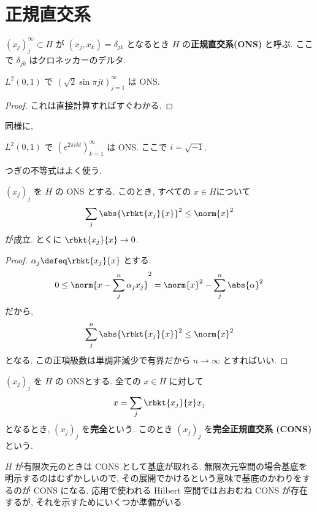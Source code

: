 \documentclass[openany, a4paper, oneside]{jsbook}
\begin{document}
\section{正規直交系}

\begin{defn}
$(x_j)_j^{\infty} \subset H$ が $(x_j, x_k) = \delta_{jk}$ となるとき
$H$ の\textbf{正規直交系(ONS)} と呼ぶ.
ここで $\delta_{jk}$ はクロネッカーのデルタ.
\end{defn}
\begin{ex}
$L^2(0, 1)$ で $(\sqrt{2}\sin \pi jt)_{j=1}^{\infty}$ は ONS.
\end{ex}
\begin{proof}
これは直接計算すればすぐわかる.
\end{proof}
同様に,
\begin{ex}
$L^2(0, 1)$ で $(e^{2 \pi i k t})_{k=1}^{\infty}$ は ONS.
ここで $i = \sqrt{-1}$.
\end{ex}

つぎの不等式はよく使う.
\begin{thm}
 $(x_j)_j$ を $H$ の ONS とする.
 このとき, すべての $x \in H $について
 \begin{align}
  \sum_j \abs{\rbkt{x_j}{x}}^2
  \le
  \norm{x}^2
 \end{align}
 が成立.
 とくに $\rbkt{x_j}{x} \to 0$.
\end{thm}
\begin{proof}
$\alpha_j \defeq \rbkt{x_j}{x}$ とする.
\begin{align}
 0
 \le
 \norm{x - \sum_j^n \alpha_j x_j}^2
 =
 \norm{x}^2 - \sum_j^n \abs{\alpha}^2
\end{align}
だから,
\begin{align}
 \sum_j^n \abs{\rbkt{x_j}{x}}^2
 \leq
 \norm{x}^2
\end{align}
となる.
この正項級数は単調非減少で有界だから $n \to \infty$ とすればいい.
\end{proof}

\begin{defn}[完全正規直交系]
$(x_j)_j$ を $H$ の ONSとする.
全ての $x \in H$ に対して
\begin{align}
 x
 =
 \sum_j \rbkt{x_j}{x} x_j
\end{align}
となるとき, $(x_j)_j$ を\textbf{完全}という.
このとき $(x_j)_j$ を\textbf{完全正規直交系 (CONS)} という.
\end{defn}
$H$ が有限次元のときは CONS として基底が取れる.
無限次元空間の場合基底を明示するのはむずかしいので,
その展開でかけるという意味で基底のかわりをするのが CONS になる.
応用で使われる Hilbert 空間ではおおむね CONS が存在するが,
それを示すためにいくつか準備がいる.
\end{document}
